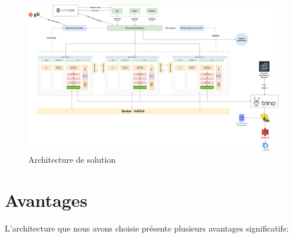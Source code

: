 \begin{figure}[H]
\centering
\includegraphics[width=\linewidth]{images/architecture-solution.png}
\caption{Architecture de solution}\label{fig:solution}
\end{figure}

\section{Avantages}

L'architecture que nous avons choisie présente plusieurs avantages significatifs:

